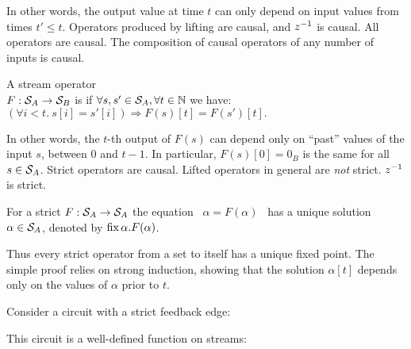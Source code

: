 \noindent
In other words, the output value at time $t$ can only depend on
input values from times $t' \leq t$.
Operators produced by lifting are causal, and $z^{-1}$ is causal.
All \dbsp operators are causal.  The composition
of causal operators of any number of inputs is causal.

\begin{definition}[Strictness]
A stream operator \\ $F:\mathcal{S}_{A}\to\mathcal{S}_{B}$
is 
if  $\forall s,s'\in\mathcal{S}_{A}, \forall t \in \mathbb{N}$ we have:
$(\forall i<t . ~s[i]=s'[i]) \Rightarrow F(s)[t]=F(s')[t].$
\end{definition}

In other words, the $t$-th output of $F(s)$ can depend only on ``past'' values
of the input $s$, between $0$ and $t-1$.
In particular, $F(s)[0] = 0_B$ is the same for all $s \in \mathcal{S}_{A}$.
Strict operators are causal. Lifted operators in general are \emph{not} strict.
$z^{-1}$ is strict.  %

\begin{proposition}
\label{prop-unique-fix}
For a strict $F: \mathcal{S}_{A} \to \mathcal{S}_{A}$ the equation ~$\alpha=F(\alpha)$~ has a unique
solution $\alpha \in \mathcal{S}_{A}$, denoted by $\mbox{fix}\,\alpha.F(\alpha)$.
\end{proposition}

Thus every strict operator from a set to itself has a unique fixed
point.  The simple proof relies on strong induction, showing that the
solution $\alpha[t]$ depends only on the values of $\alpha$ prior to
$t$.

Consider a circuit with a strict feedback edge:
\begin{center}
\end{center}

This circuit is a well-defined function on streams:


